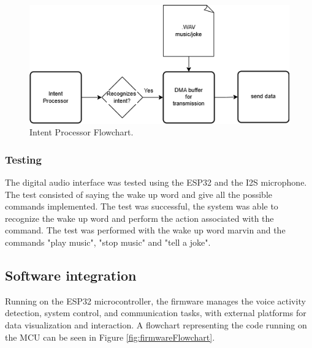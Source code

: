 \begin{figure}[H]
    \centering
    \includegraphics*[scale = 0.6]{Images/intentProcessor.png}
    \caption{Intent Processor Flowchart.}
    \label{fig:intentProcessor}
\end{figure}

\subsubsection{Testing}

The digital audio interface was tested using the ESP32 and the I2S microphone. The test consisted of saying the wake up word and give all the possible commands implemented. The test was successful, the system was able to recognize the wake up word and perform the action associated with the command. The test was performed with the wake up word marvin and the commands "play music", "stop music" and "tell a joke". 

\subsection{Software integration}
\label{sec:SoftwareInt}
Running on the ESP32 microcontroller, the firmware manages the voice activity detection, system control, and communication tasks, with external platforms for data visualization and interaction. A flowchart representing the code running on the MCU can be seen in Figure \ref{fig:firmwareFlowchart}. 

